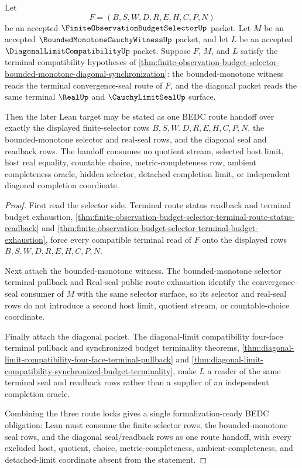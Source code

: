 \begin{theorem}
\label{thm:finite-observation-budget-selector-bounded-monotone-diagonal-synchronization-lean-handoff}
Let
$$
F=(B,S,W,D,R,E,H,C,P,N)
$$
be an accepted $\FiniteObservationBudgetSelectorUp$ packet. Let $M$ be an accepted $\BoundedMonotoneCauchyWitnessUp$ packet, and let $L$ be an accepted $\DiagonalLimitCompatibilityUp$ packet. Suppose $F$, $M$, and $L$ satisfy the terminal compatibility hypotheses of \autoref{thm:finite-observation-budget-selector-bounded-monotone-diagonal-synchronization}: the bounded-monotone witness reads the terminal convergence-seal route of $F$, and the diagonal packet reads the same terminal $\RealUp$ and $\CauchyLimitSealUp$ surface.

Then the later Lean target may be stated as one BEDC route handoff over exactly the displayed finite-selector rows $B,S,W,D,R,E,H,C,P,N$, the bounded-monotone selector and real-seal rows, and the diagonal seal and readback rows. The handoff consumes no quotient stream, selected host limit, host real equality, countable choice, metric-completeness row, ambient completeness oracle, hidden selector, detached completion limit, or independent diagonal completion coordinate.
\end{theorem}
\begin{proof}
First read the selector side. Terminal route status readback and terminal budget exhaustion, \autoref{thm:finite-observation-budget-selector-terminal-route-status-readback} and \autoref{thm:finite-observation-budget-selector-terminal-budget-exhaustion}, force every compatible terminal read of $F$ onto the displayed rows $B,S,W,D,R,E,H,C,P,N$.

Next attach the bounded-monotone witness. The bounded-monotone selector terminal pullback and Real-seal public route exhaustion identify the convergence-seal consumer of $M$ with the same selector surface, so its selector and real-seal rows do not introduce a second host limit, quotient stream, or countable-choice coordinate.

Finally attach the diagonal packet. The diagonal-limit compatibility four-face terminal pullback and synchronized budget terminality theorems, \autoref{thm:diagonal-limit-compatibility-four-face-terminal-pullback} and \autoref{thm:diagonal-limit-compatibility-synchronized-budget-terminality}, make $L$ a reader of the same terminal seal and readback rows rather than a supplier of an independent completion oracle.

Combining the three route locks gives a single formalization-ready BEDC obligation: Lean must consume the finite-selector rows, the bounded-monotone seal rows, and the diagonal seal/readback rows as one route handoff, with every excluded host, quotient, choice, metric-completeness, ambient-completeness, and detached-limit coordinate absent from the statement.
\end{proof}

